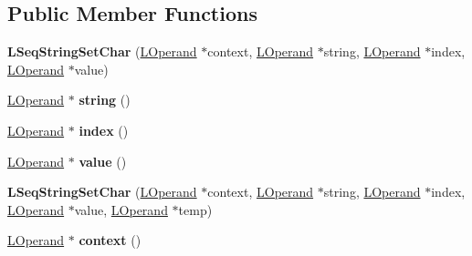 \subsection*{Public Member Functions}
\begin{DoxyCompactItemize}
\item 
{\bfseries L\+Seq\+String\+Set\+Char} (\hyperlink{classv8_1_1internal_1_1_l_operand}{L\+Operand} $\ast$context, \hyperlink{classv8_1_1internal_1_1_l_operand}{L\+Operand} $\ast$string, \hyperlink{classv8_1_1internal_1_1_l_operand}{L\+Operand} $\ast$index, \hyperlink{classv8_1_1internal_1_1_l_operand}{L\+Operand} $\ast$value)\hypertarget{classv8_1_1internal_1_1_l_seq_string_set_char_a719cac196a8e6c740c4055635b87f496}{}\label{classv8_1_1internal_1_1_l_seq_string_set_char_a719cac196a8e6c740c4055635b87f496}

\item 
\hyperlink{classv8_1_1internal_1_1_l_operand}{L\+Operand} $\ast$ {\bfseries string} ()\hypertarget{classv8_1_1internal_1_1_l_seq_string_set_char_a1fcee06e873470500f85a41f75bd0faa}{}\label{classv8_1_1internal_1_1_l_seq_string_set_char_a1fcee06e873470500f85a41f75bd0faa}

\item 
\hyperlink{classv8_1_1internal_1_1_l_operand}{L\+Operand} $\ast$ {\bfseries index} ()\hypertarget{classv8_1_1internal_1_1_l_seq_string_set_char_ab3e762192555a55b62a9b438635a1178}{}\label{classv8_1_1internal_1_1_l_seq_string_set_char_ab3e762192555a55b62a9b438635a1178}

\item 
\hyperlink{classv8_1_1internal_1_1_l_operand}{L\+Operand} $\ast$ {\bfseries value} ()\hypertarget{classv8_1_1internal_1_1_l_seq_string_set_char_aeb1a6ce9adf8943da9ec22afe2b5af72}{}\label{classv8_1_1internal_1_1_l_seq_string_set_char_aeb1a6ce9adf8943da9ec22afe2b5af72}

\item 
{\bfseries L\+Seq\+String\+Set\+Char} (\hyperlink{classv8_1_1internal_1_1_l_operand}{L\+Operand} $\ast$context, \hyperlink{classv8_1_1internal_1_1_l_operand}{L\+Operand} $\ast$string, \hyperlink{classv8_1_1internal_1_1_l_operand}{L\+Operand} $\ast$index, \hyperlink{classv8_1_1internal_1_1_l_operand}{L\+Operand} $\ast$value, \hyperlink{classv8_1_1internal_1_1_l_operand}{L\+Operand} $\ast$temp)\hypertarget{classv8_1_1internal_1_1_l_seq_string_set_char_ae40783ddb111465c796a7ea31d3f489d}{}\label{classv8_1_1internal_1_1_l_seq_string_set_char_ae40783ddb111465c796a7ea31d3f489d}

\item 
\hyperlink{classv8_1_1internal_1_1_l_operand}{L\+Operand} $\ast$ {\bfseries context} ()\hypertarget{classv8_1_1internal_1_1_l_seq_string_set_char_adf370f7897ef6952d249e9304e2e293d}{}\label{classv8_1_1internal_1_1_l_seq_string_set_char_adf370f7897ef6952d249e9304e2e293d}


\end{DoxyCompactItemize}
